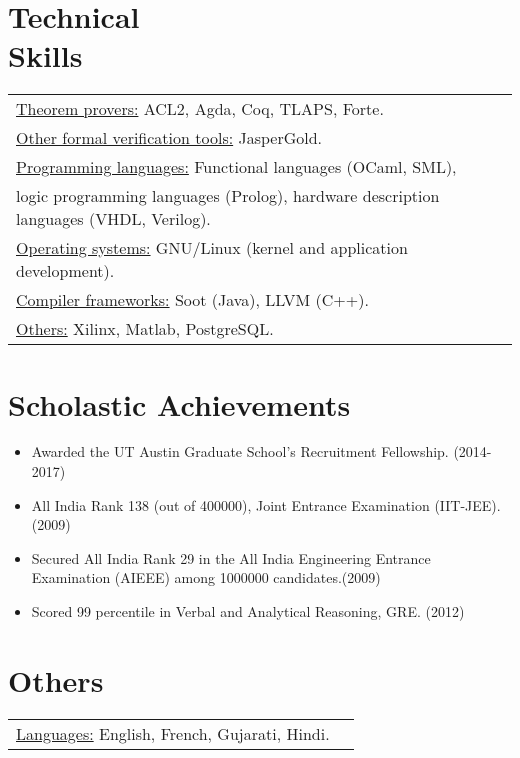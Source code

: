 \documentclass[margin]{res}
\begin{document}
\begin{resume}
\section{Technical \\ Skills}
   \begin{tabular}{l p{3in}}
    \underline{Theorem provers:} ACL2, Agda, Coq, TLAPS, Forte. \\
    \underline{Other formal verification tools:} JasperGold. \\

    \underline{Programming languages:} Functional languages (OCaml,
    SML), \\ logic programming languages (Prolog),
    hardware description languages (VHDL, Verilog). \\

    \underline{Operating systems:} GNU/Linux (kernel and application development). \\

    \underline{Compiler frameworks:} Soot (Java), LLVM (C++). \\

    \underline{Others:} Xilinx, Matlab, PostgreSQL. \\
 \end{tabular}

\section{Scholastic Achievements}
 \begin{itemize} \itemsep -2pt  %
 \item Awarded the UT Austin Graduate School's Recruitment
   Fellowship. \hfill (2014-2017)
 \item All India Rank 138 (out of 400000), Joint Entrance Examination
   (IIT-JEE). \hfill (2009)
 \item Secured All India Rank 29 in the All India Engineering Entrance
   Examination (AIEEE) among 1000000 candidates.\hfill (2009)
 \item Scored 99 percentile in Verbal and Analytical Reasoning,
   GRE. \hfill (2012)
 \end{itemize}

\section{Others}
\begin{tabular}{l p{3in}}
  \underline{Languages:} English, French, Gujarati, Hindi. \\
\end{tabular}

\end{resume}
\end{document}
